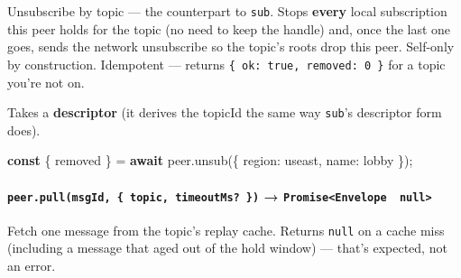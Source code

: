 \documentclass[
  nobib]{tufte-handout}
\newenvironment{Shaded}{}{}
\newcommand{\ControlFlowTok}[1]{\textcolor[rgb]{0.00,0.44,0.13}{\textbf{#1}}}
\newcommand{\DataTypeTok}[1]{\textcolor[rgb]{0.56,0.13,0.00}{#1}}
\newcommand{\FunctionTok}[1]{\textcolor[rgb]{0.02,0.16,0.49}{#1}}
\newcommand{\KeywordTok}[1]{\textcolor[rgb]{0.00,0.44,0.13}{\textbf{#1}}}
\newcommand{\NormalTok}[1]{#1}
\newcommand{\OperatorTok}[1]{\textcolor[rgb]{0.40,0.40,0.40}{#1}}
\newcommand{\StringTok}[1]{\textcolor[rgb]{0.25,0.44,0.63}{#1}}
\renewcommand{\subsubsection}[1]{\medskip\par\noindent{\normalsize\bfseries #1}\par\nobreak\smallskip}
\begin{document}
Unsubscribe by topic --- the counterpart to \texttt{sub}. Stops
\textbf{every} local subscription this peer holds for the topic (no need
to keep the handle) and, once the last one goes, sends the network
unsubscribe so the topic's roots drop this peer. Self-only by
construction. Idempotent --- returns
\texttt{\{\ ok:\ true,\ removed:\ 0\ \}} for a topic you're not on.

Takes a \textbf{descriptor} (it derives the topicId the same way
\texttt{sub}'s descriptor form does).

\begin{Shaded}
\begin{Highlighting}[]
\KeywordTok{const}\NormalTok{ \{ removed \} }\OperatorTok{=} \ControlFlowTok{await}\NormalTok{ peer}\OperatorTok{.}\FunctionTok{unsub}\NormalTok{(\{ }\DataTypeTok{region}\OperatorTok{:} \StringTok{\textquotesingle{}useast\textquotesingle{}}\OperatorTok{,} \DataTypeTok{name}\OperatorTok{:} \StringTok{\textquotesingle{}lobby\textquotesingle{}}\NormalTok{ \})}\OperatorTok{;}
\end{Highlighting}
\end{Shaded}

\subsubsection{4.3 pull / metrics}\label{pull-metrics}

\paragraph{\texorpdfstring{\texttt{peer.pull(msgId,\ \{\ topic,\ timeoutMs?\ \})}
→
\texttt{Promise\textless{}Envelope\ \textbar{}\ null\textgreater{}}}{peer.pull(msgId, \{ topic, timeoutMs? \}) → Promise\textless Envelope \textbar{} null\textgreater{}}}\label{peer.pullmsgid-topic-timeoutms-promiseenvelope-null}

Fetch one message from the topic's replay cache. Returns \texttt{null}
on a cache miss (including a message that aged out of the hold window)
--- that's expected, not an error.
\end{document}
